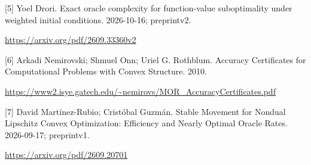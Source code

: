 \documentclass[10pt,a4paper]{article}
\begin{document}
[5] Yoel Drori. Exact oracle complexity for function-value suboptimality under weighted initial conditions. 2026-10-16; preprintv2.

\url{https://arxiv.org/pdf/2609.33360v2}

[6] Arkadi Nemirovski; Shmuel Onn; Uriel G. Rothblum. Accuracy Certificates for Computational Problems with Convex Structure. 2010.

\url{https://www2.isye.gatech.edu/~nemirovs/MOR_AccuracyCertificates.pdf}

[7] David Martínez-Rubio; Cristóbal Guzmán. Stable Movement for Nondual Lipschitz Convex Optimization: Efficiency and Nearly Optimal Oracle Rates. 2026-09-17; preprintv1.

\url{https://arxiv.org/pdf/2609.20701}
\end{document}
